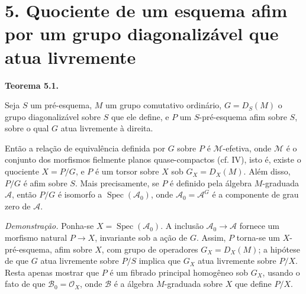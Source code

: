 
\section*{5. Quociente de um esquema afim por um grupo diagonalizável que atua livremente}

\medskip
\noindent{}\textbf{Teorema 5.1.}
\begin{itshape}
Seja \(S\) um pré-esquema, \(M\) um grupo comutativo ordinário,
\(G=D_S(M)\) o grupo diagonalizável sobre \(S\) que ele define, e \(P\)
um \(S\)-pré-esquema afim sobre \(S\), sobre o qual \(G\) atua livremente
à direita.

Então a relação de equivalência definida por \(G\) sobre \(P\) é
\(\mathcal M\)-efetiva, onde \(\mathcal M\) é o conjunto dos morfismos
fielmente planos quase-compactos (cf. IV), isto é, existe o quociente
\(X=P/G\), e \(P\) é um torsor sobre \(X\) sob \(G_X=D_X(M)\). Além disso,
\(P/G\) é afim sobre \(S\). Mais precisamente, se \(P\) é definido pela
álgebra \(M\)-graduada \(\mathcal A\), então \(P/G\) é isomorfo a
\(\operatorname{Spec}(\mathcal A_0)\), onde
\(\mathcal A_0=\mathcal A^G\) é a componente de grau zero de
\(\mathcal A\).
\end{itshape}

\smallskip
\noindent\textit{Demonstração.}
Ponha-se \(X=\operatorname{Spec}(\mathcal A_0)\). A inclusão
\(\mathcal A_0\to\mathcal A\) fornece um morfismo natural \(P\to X\),
invariante sob a ação de \(G\). Assim, \(P\) torna-se um
\(X\)-pré-esquema, afim sobre \(X\), com grupo de operadores
\(G_X=D_X(M)\); a hipótese de que \(G\) atua livremente sobre \(P/S\)
implica que \(G_X\) atua livremente sobre \(P/X\). Resta apenas mostrar que
\(P\) é um fibrado principal homogêneo sob \(G_X\), usando o fato de
que \(\mathcal B_0=\mathcal O_X\), onde \(\mathcal B\) é a álgebra
\(M\)-graduada sobre \(X\) que define \(P/X\).

